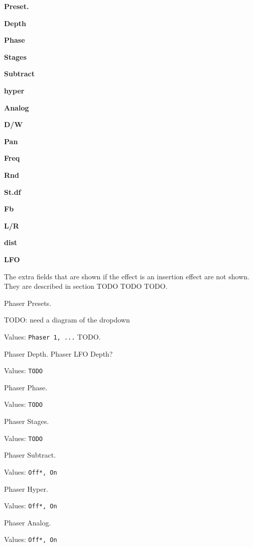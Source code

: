    \begin{enumber}
      \item \textbf{Preset.}
      \item \textbf{Depth}
      \item \textbf{Phase}
      \item \textbf{Stages}
      \item \textbf{Subtract}
      \item \textbf{hyper}
      \item \textbf{Analog}
      \item \textbf{D/W}
      \item \textbf{Pan}
      \item \textbf{Freq}
      \item \textbf{Rnd}
      \item \textbf{St.df}
      \item \textbf{Fb}
      \item \textbf{L/R}
      \item \textbf{dist}
      \item \textbf{LFO}
   \end{enumber}

   The extra fields that are shown if the effect is an insertion effect are
   not shown.  They are described in section TODO TODO TODO.

   Phaser Presets.

   TODO: need a diagram of the dropdown

   Values: \texttt{Phaser 1, ...} TODO.

   Phaser Depth. Phaser LFO Depth?

   Values: \texttt{TODO}

   Phaser Phase.

   Values: \texttt{TODO}

   Phaser Stages.

   Values: \texttt{TODO}

   Phaser Subtract.

   Values: \texttt{Off*, On}

   Phaser Hyper.

   Values: \texttt{Off*, On}

   Phaser Analog.

   Values: \texttt{Off*, On}

